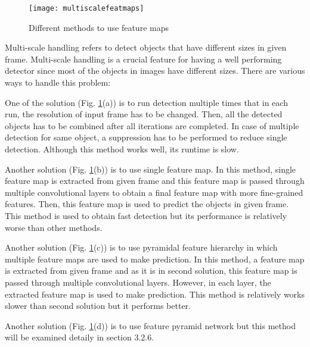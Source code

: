 \documentclass{article}
\begin{document}
\setlength{\parindent}{6ex}

\begin{figure}
    \centering
    \texttt{[image: multiscalefeatmaps]}
    \caption{Different methods to use feature maps}
    \label{fig:multiscalefeatmaps1}
\end{figure}

\indent

Multi-scale handling refers to detect objects that have different 
sizes in given frame. Multi-scale handling is a crucial feature for 
having a well performing detector since most of the objects in images
have different sizes. There are various ways to handle this problem: \par

One of the solution (Fig. \ref{fig:multiscalefeatmaps1}(a)) is to run detection multiple times that in each 
run, the resolution of input frame has to be changed. Then, all the 
detected objects has to be combined after all iterations are completed. 
In case of multiple detection for same object, a suppression has to be 
performed to reduce single detection. Although this method works well, 
its runtime is slow. \par

Another solution (Fig. \ref{fig:multiscalefeatmaps1}(b)) is to use single feature map. In this method, single 
feature map is extracted from given frame and this feature map is passed 
through multiple convolutional layers to obtain a final feature map with 
more fine-grained features. Then, this feature map is used to predict the 
objects in given frame. This method is used to obtain fast detection but 
its performance is relatively worse than other methods. \par

Another solution (Fig. \ref{fig:multiscalefeatmaps1}(c)) is to use pyramidal feature hierarchy in which multiple 
feature maps are used to make prediction. In this method, a feature map 
is extracted from given frame and as it is in second solution, this 
feature map is passed through multiple convolutional layers. However, 
in each layer, the extracted feature map is used to make prediction. This 
method is relatively works slower than second solution but it performs better. \par

Another solution (Fig. \ref{fig:multiscalefeatmaps1}(d)) is to use feature pyramid network but this method will be 
examined detaily in section 3.2.6. 
\end{document}
